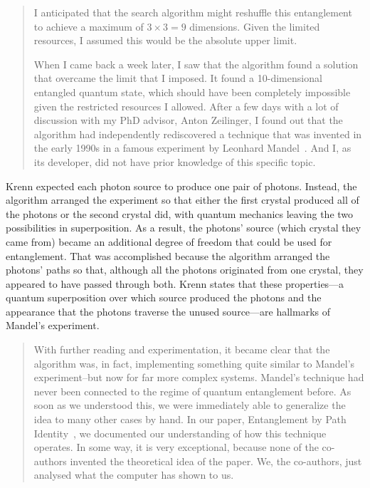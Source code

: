\begin{quote}
I anticipated that the search algorithm might reshuffle this entanglement to achieve a maximum of $3 \times 3 = 9$ dimensions. Given the limited resources, I assumed this would be the absolute upper limit.

When I came back a week later, I saw that the algorithm found a solution that overcame the limit that I imposed. 
It found a 10-dimensional entangled quantum state, which should have been completely impossible given the restricted resources I allowed.
After a few days with a lot of discussion with my PhD advisor, Anton Zeilinger, I found out that the algorithm had independently rediscovered a technique that was invented in the early 1990s in a famous experiment by Leonhard Mandel~\citep{Mandel1991Optic}. And I, as its developer, did not have prior knowledge of this specific topic.

\end{quote}

Krenn expected each photon source to produce one pair of photons. Instead, the algorithm arranged the experiment so that either the first crystal produced all of the photons or the second crystal did, with quantum mechanics leaving the two possibilities in superposition. As a result, the photons' source (which crystal they came from) became an additional degree of freedom that could be used for entanglement. That was accomplished because the algorithm arranged the photons' paths so that, although all the photons originated from one crystal, they appeared to have passed through both. Krenn states that these properties---a quantum superposition over which source produced the photons and the appearance that the photons traverse the unused source---are hallmarks of Mandel's experiment.

\begin{quote}

With further reading and experimentation, it became clear that the algorithm was, in fact, implementing something quite similar to Mandel's experiment--but now for far more complex systems.
Mandel's technique had never been connected to the regime of quantum entanglement before. As soon as we understood this, we were immediately able to generalize the idea to many other cases by hand. %
In our paper, Entanglement by Path Identity~\citep{KrennEntangle2017}, we documented our understanding of how this technique operates.
In some way, it is very exceptional, because none of the co-authors invented the theoretical idea of the paper. We, the co-authors, just analysed what the computer has shown to us.

\end{quote}

